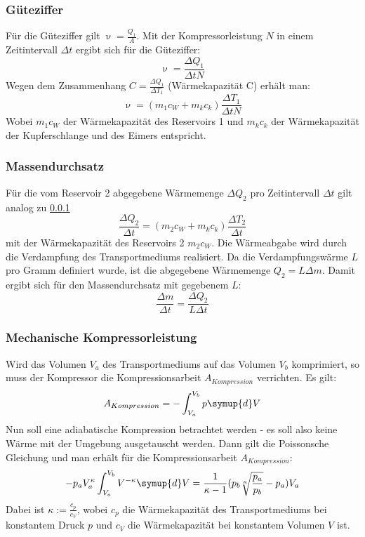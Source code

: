 \subsubsection {Güteziffer}
\label{sec:gueteziffer}
Für die Güteziffer gilt $\upnu = \frac{Q_1}{A}$. Mit der Kompressorleistung $N$ in einem Zeitintervall $\Delta t$ ergibt sich für die Güteziffer:
\begin{equation}
	\upnu = \frac{\Delta Q_1}{\Delta t N}
\end{equation}
Wegen dem Zusammenhang $C = \frac{\Delta Q_1}{\Delta T_1}$ (Wärmekapazität C) erhält man:
\begin{equation}
	\label{eqn:gueteziffer}
	\upnu = (m_1 c_W + m_k c_k) \frac{\Delta T_1}{\Delta t N}
\end{equation}
Wobei $m_1 c_W$ der Wärmekapazität des Reservoirs 1 und $m_k c_k$ der Wärmekapazität der Kupferschlange und des Eimers entspricht.

\subsubsection {Massendurchsatz}
\label{sec:massendurchsatz}
Für die vom Reservoir 2 abgegebene Wärmemenge $\Delta Q_2$ pro Zeitintervall $\Delta t$ gilt analog zu \ref{sec:gueteziffer}
\begin{equation}
	\frac{\Delta Q_2}{\Delta t} = (m_2 c_W + m_k c_k) \frac{\Delta T_2}{\Delta t}
\end{equation}
mit der Wärmekapazität des Reservoirs 2 $m_2 c_W$.
Die Wärmeabgabe wird durch die Verdampfung des Transportmediums realisiert.
Da die Verdampfungswärme $L$ pro Gramm definiert wurde, ist die abgegebene Wärmemenge $Q_2 = L \Delta m$. Damit ergibt sich für den Massendurchsatz mit gegebenem $L$:
\begin{equation}
	\label{eqn:massendurchsatz}
	\frac{\Delta m}{\Delta t} = \frac{\Delta Q_2}{L \Delta t}
\end{equation}



\subsubsection {Mechanische Kompressorleistung}
\label{sec:kompressorleistung}
Wird das Volumen $V_a$ des Transportmediums auf das Volumen $V_b$ komprimiert, so muss der Kompressor die Kompressionsarbeit $A_{Kompression}$ verrichten. Es gilt:
\begin{equation}
	A_{Kompression} = -\int_{V_a}^{V_b} p \symup{d}V
\end{equation}
Nun soll eine adiabatische Kompression betrachtet werden - es soll also keine Wärme mit der Umgebung ausgetauscht werden.
Dann gilt die Poissonsche Gleichung und man erhält für die Kompressionsarbeit $A_{Kompression}$:
\begin{equation}
	-p_a V_a^{\kappa} \int_{V_a}^{V_b} V^{-\kappa} \symup{d}V = \frac{1}{\kappa - 1} (p_b \sqrt[\kappa]{\frac{p_a}{p_b}} - p_a) V_a
\end{equation}
Dabei ist $\kappa := \frac{c_p}{c_V}$, wobei $c_p$ die Wärmekapazität des Transportmediums bei konstantem Druck $p$ und $c_V$ die Wärmekapazität bei konstantem Volumen $V$ ist.

